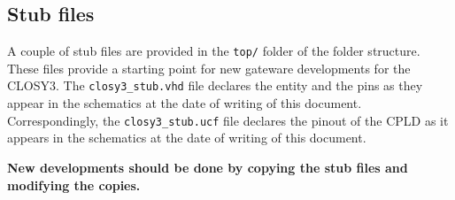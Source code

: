 \documentclass[a4paper,11pt]{article}
\begin{document}
\subsection{Stub files}
\label{sec:sources-stubs}

A couple of stub files are provided in the \verb=top/= folder of the folder structure.
These files provide a starting point for new gateware developments for the CLOSY3.
The \verb=closy3_stub.vhd= file declares the entity and the pins as they appear in the 
schematics at the date of writing of this document. Correspondingly, the 
\verb=closy3_stub.ucf= file declares the pinout of the CPLD as it appears in the 
schematics at the date of writing of this document.

\textbf{New developments should be done by copying the stub files and modifying the 
copies.}

\pagebreak


\end{document}
